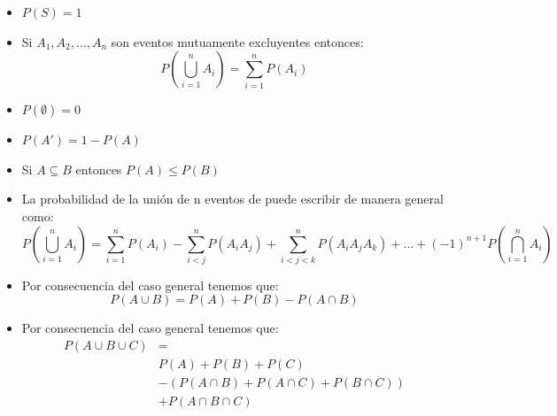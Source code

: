 \documentclass[12pt, fleqn]{report}                             %
\theoremstyle{break}                                            %
\newcommand{\Wrap}[1]{\left( #1 \right)}                        %
\begin{document}
                \begin{itemize}
                    \item
                        $P(S) = 1$
                    
                    \item
                        Si $A_1, A_2, \dots, A_n$ son eventos mutuamente excluyentes entonces:
                        \begin{equation*}
                            P\Wrap{\bigcup_{i = 1}^n A_i} 
                                = \sum_{i = 1}^n P(A_i)    
                        \end{equation*}
                    
                    \item 
                        $P(\emptyset) = 0$
                    
                    \item 
                        $P(A') = 1 - P(A)$

                    \item 
                        Si $A \subseteq B$ entonces $P(A) \leq P(B)$

                    \item
                        La probabilidad de la unión de n eventos de puede escribir de manera general como:
                        \begin{equation*}
                            P\Wrap{\bigcup_{i = 1}^n A_i} 
                            = 
                                \sum_{i = 1}^n P(A_i) 
                                - \sum_{i < j}^n P(A_iA_j) 
                                + \sum_{i < j < k}^n P(A_iA_jA_k)
                                + \dots
                                + (-1)^{n+1} P\Wrap{\bigcap_{i = 1}^n A_i}
                        \end{equation*}
                    
                    \item Por consecuencia del caso general tenemos que: 
                        \begin{equation*}
                            P(A \cup B) = P(A) + P(B) - P(A \cap B)   
                        \end{equation*}
                    
                    \item Por consecuencia del caso general tenemos que: 
                        \begin{align*}
                            P(A \cup B \cup C) 
                                &=                                              \\
                                &P(A) + P(B) + P(C)                             \\
                                &-(P(A \cap B) + P(A \cap C) + P(B \cap C))     \\
                                &+ P(A \cap B \cap C)   
                        \end{align*}


\end{itemize}
\end{document}
